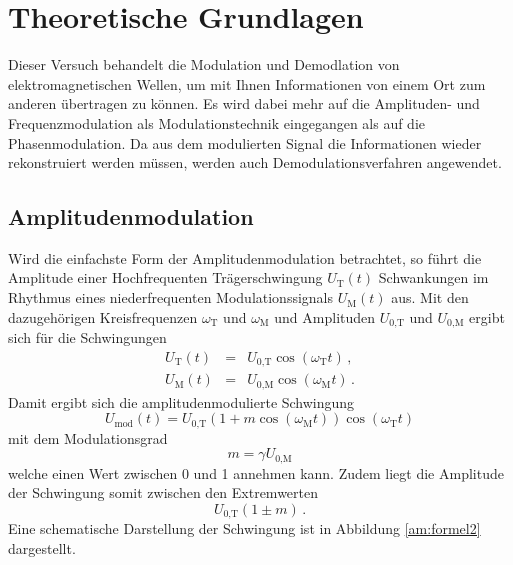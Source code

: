 \section{Theoretische Grundlagen}
\label{sec:theorie}

Dieser Versuch behandelt die Modulation und Demodlation von elektromagnetischen Wellen, um mit Ihnen Informationen von einem Ort
zum anderen übertragen zu können.
Es wird dabei mehr auf die Amplituden- und Frequenzmodulation als Modulationstechnik eingegangen als auf die Phasenmodulation.
Da aus dem modulierten Signal die Informationen wieder rekonstruiert werden müssen, werden auch Demodulationsverfahren angewendet.

\subsection{Amplitudenmodulation}
\label{subsec:klassisch}

Wird die einfachste Form der Amplitudenmodulation betrachtet, so führt die Amplitude einer Hochfrequenten Trägerschwingung $U_\text{T}(t)$ Schwankungen im Rhythmus eines niederfrequenten Modulationssignals $U_\text{M}(t)$ aus.
Mit den dazugehörigen Kreisfrequenzen $\omega_\text{T}$ und $\omega_\text{M}$ und Amplituden $U_\text{0,T}$ und $U_\text{0,M}$ ergibt sich für die Schwingungen
\begin{eqnarray*}
    U_\text{T}(t) &=& U_\text{0,T} \cos{\left(\omega_\text{T} t\right)}\, , \\
    U_\text{M}(t) &=& U_\text{0,M} \cos{\left(\omega_\text{M} t \right)}\, .
\end{eqnarray*}
Damit ergibt sich die amplitudenmodulierte Schwingung 
\begin{equation}
    U_\text{mod}(t) = U_\text{0,T} ( 1 + m \cos{\left( \omega_\text{M} t \right)} ) \cos{\left(\omega_\text{T} t\right)} \label{am:formel1}
\end{equation}
mit dem Modulationsgrad
\begin{equation}
    m = \gamma U_\text{0,M}
\end{equation}
welche einen Wert zwischen 0 und 1 annehmen kann.
Zudem liegt die Amplitude der Schwingung somit zwischen den Extremwerten
\begin{equation}
    U_\text{0,T} (1 \pm m)\,.
\end{equation}
Eine schematische Darstellung der Schwingung ist in Abbildung \ref{am:formel2} dargestellt.


